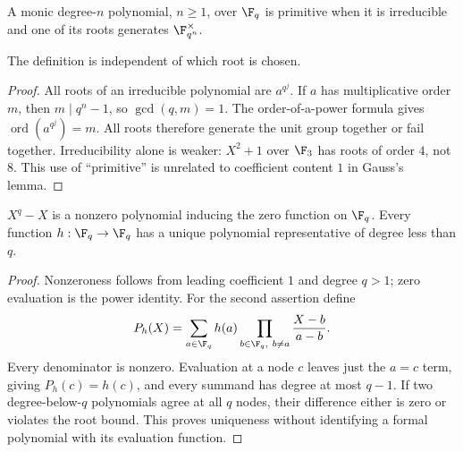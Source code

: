 \begin{definition}
A monic degree-$n$ polynomial, $n\geq1$, over $\F_q$ is primitive when it is irreducible and one of its roots generates $\F_{q^n}^\times$.
\end{definition}
\begin{proposition}
The definition is independent of which root is chosen.
\end{proposition}
\begin{proof}
All roots of an irreducible polynomial are $a^{q^j}$. If $a$ has multiplicative order $m$, then $m\mid q^n-1$, so $\gcd(q,m)=1$. The order-of-a-power formula gives $\operatorname{ord}(a^{q^j})=m$. All roots therefore generate the unit group together or fail together. Irreducibility alone is weaker: $X^2+1$ over $\F_3$ has roots of order $4$, not $8$. This use of ``primitive'' is unrelated to coefficient content $1$ in Gauss's lemma.
\end{proof}

\begin{theorem}
$X^q-X$ is a nonzero polynomial inducing the zero function on $\F_q$. Every function $h:\F_q\to\F_q$ has a unique polynomial representative of degree less than $q$.
\end{theorem}
\begin{proof}
Nonzeroness follows from leading coefficient $1$ and degree $q>1$; zero evaluation is the power identity. For the second assertion define
\[P_h(X)=\sum_{a\in\F_q}h(a)\prod_{b\in\F_q,\ b\ne a}\frac{X-b}{a-b}.
\]
Every denominator is nonzero. Evaluation at a node $c$ leaves just the $a=c$ term, giving $P_h(c)=h(c)$, and every summand has degree at most $q-1$. If two degree-below-$q$ polynomials agree at all $q$ nodes, their difference either is zero or violates the root bound. This proves uniqueness without identifying a formal polynomial with its evaluation function.
\end{proof}

